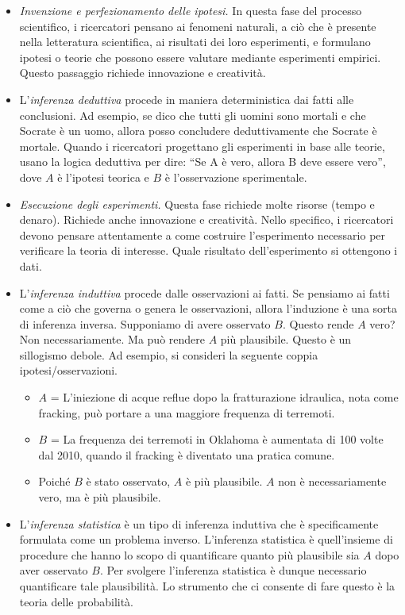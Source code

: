 \documentclass[
  11pt,
]{krantz}
\theoremstyle{definition}
\theoremstyle{definition}
\theoremstyle{definition}
\theoremstyle{definition}
\theoremstyle{remark}
\begin{document}
\begin{itemize}
\item
  \emph{Invenzione e perfezionamento delle ipotesi.} In questa fase del processo scientifico, i ricercatori pensano ai fenomeni naturali, a ciò che è presente nella letteratura scientifica, ai risultati dei loro esperimenti, e formulano ipotesi o teorie che possono essere valutare mediante esperimenti empirici. Questo passaggio richiede innovazione e creatività.
\item
  L'\emph{inferenza deduttiva} procede in maniera deterministica dai fatti alle conclusioni. Ad esempio, se dico che tutti gli uomini sono mortali e che Socrate è un uomo, allora posso concludere deduttivamente che Socrate è mortale. Quando i ricercatori progettano gli esperimenti in base alle teorie, usano la logica deduttiva per dire: ``Se A è vero, allora B deve essere vero'', dove \(A\) è l'ipotesi teorica e \(B\) è l'osservazione sperimentale.
\item
  \emph{Esecuzione degli esperimenti.} Questa fase richiede molte risorse (tempo e denaro). Richiede anche innovazione e creatività. Nello specifico, i ricercatori devono pensare attentamente a come costruire l'esperimento necessario per verificare la teoria di interesse. Quale risultato dell'esperimento si ottengono i dati.
\item
  L'\emph{inferenza induttiva} procede dalle osservazioni ai fatti. Se pensiamo ai fatti come a ciò che governa o genera le osservazioni, allora l'induzione è una sorta di inferenza inversa. Supponiamo di avere osservato \(B\). Questo rende \(A\) vero? Non necessariamente. Ma può rendere \(A\) più plausibile. Questo è un sillogismo debole. Ad esempio, si consideri la seguente coppia ipotesi/osservazioni.

  \begin{itemize}
  \item
    \(A\) = L'iniezione di acque reflue dopo la fratturazione idraulica, nota come fracking, può portare a una maggiore frequenza di terremoti.
  \item
    \(B\) = La frequenza dei terremoti in Oklahoma è aumentata di 100 volte dal 2010, quando il fracking è diventato una pratica comune.
  \item
    Poiché \(B\) è stato osservato, \(A\) è più plausibile. \(A\) non è necessariamente vero, ma è più plausibile.
  \end{itemize}
\item
  L'\emph{inferenza statistica} è un tipo di inferenza induttiva che è specificamente formulata come un problema inverso. L'inferenza statistica è quell'insieme di procedure che hanno lo scopo di quantificare quanto più plausibile sia \(A\) dopo aver osservato \(B\). Per svolgere l'inferenza statistica è dunque necessario quantificare tale plausibilità. Lo strumento che ci consente di fare questo è la teoria delle probabilità.
\end{itemize}
\end{document}
